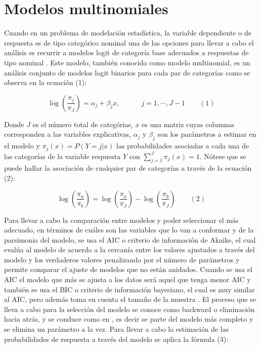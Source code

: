 \documentclass[]{book}
\theoremstyle{definition}
\theoremstyle{definition}
\theoremstyle{definition}
\theoremstyle{remark}
\begin{document}
\section{Modelos multinomiales}\label{modelos-multinomiales}

Cuando en un problema de modelación estadística, la variable dependiente
o de respuesta es de tipo categórico nominal una de las opciones para
llevar a cabo el análisis es recurrir a modelos logit de categoría base
adecuados a respuestas de tipo nominal \citep[pp.~267]{Agresti}. Este
modelo, también conocido como modelo multinomial, es un análisis
conjunto de modelos logit binarios para cada par de categorías como se
observa en la ecuación (1):

\[\log { \left( \frac { { \pi  }_{ j } }{ { \pi  }_{ J } }  \right)  } ={ \alpha  }_{ j }+{ \beta  }_{ j }x,\quad \quad \quad j=1,\cdots ,J-1 \quad \quad(1)\]

Donde \(J\) es el número total de categórias, \(x\) es una matriz cuyas
columnas corresponden a las variables explicativas, \({ \alpha }_{ j }\)
y \({ \beta }_{ j }\) son los parámetros a estimar en el modelo y
\({ \pi }_{ j }(x)=P(Y=j|x)\) las probabilidades asociadas a cada una de
las categorías de la variable respuesta \(Y\) con
\(\sum _{ j=1 }^{ J }{ { \pi }_{ j }(x) } =1\). Nótese que se puede
hallar la asociación de cualquier par de categorías a través de la
ecuación (2):

\[\log { \left( \frac { { \pi  }_{ a } }{ { \pi  }_{ b } }  \right)  } =\log { \left( \frac { { \pi  }_{ a } }{ { \pi  }_{ J } }  \right)  } -\log { \left( \frac { { \pi  }_{ b } }{ { \pi  }_{ J } }  \right)  } \quad \quad (2)\]

Para llevar a cabo la comparación entre modelos y poder seleccionar el
más adecuado, en términos de cuáles son las variables que lo van a
conformar y de la parsimonia del modelo, se usa el AIC o criterio de
información de Akaike, el cual evalúa al modelo de acuerdo a la cercanía
entre los valores ajustados a través del modelo y los verdaderos valores
penalizando por el número de parámetros \citep[pp.~216]{Agresti} y
permite comparar el ajuste de modelos que no están anidados. Cuando se
usa el AIC el modelo que más se ajusta a los datos será aquel que tenga
menor AIC y también se usa el BIC o criterio de información bayesiano,
el cual es muy similar al AIC, pero además toma en cuenta el tamaño de
la muestra \citep[pp.~257]{Agresti}. El proceso que se lleva a cabo para
la selección del modelo se conoce como backward o eliminación hacia
atrás, y se conduce como en \citet[ pp.~214]{Agresti}, es decir se parte
del modelo más completo y se elimina un parámetro a la vez. Para llevar
a cabo la estimación de las probabilidades de respuesta a través del
modelo se aplica la fórmula (3):
\end{document}
